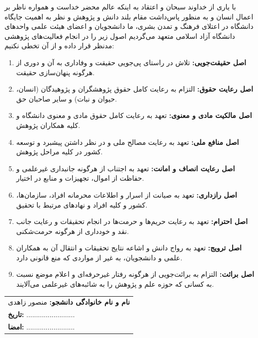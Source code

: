 با یاری از خداوند سبحان و اعتقاد به اینکه عالم محضر خداست و همواره ناظر بر اعمال انسان و به منظور پاس‌داشت مقام بلند دانش و پژوهش و نظر به اهمیت جایگاه دانشگاه در اعتلای فرهنگ و تمدن بشری، ما دانشجویان و اعضای هیئت علمی واحدهای دانشگاه آزاد اسلامی متعهد می‌گردیم اصول زیر را در انجام فعالیت‌های پژوهشی مدنظر قرار داده و از آن تخطی نکنیم:

\begin{enumerate}
    \item \textbf{اصل حقیقت‌جویی:} تلاش در راستای پی‌جویی حقیقت و وفاداری به آن و دوری از هرگونه پنهان‌سازی حقیقت.
    \item \textbf{اصل رعایت حقوق:} التزام به رعایت کامل حقوق پژوهشگران و پژوهیدگان (انسان، حیوان و نبات) و سایر صاحبان حق.
    \item \textbf{اصل مالکیت مادی و معنوی:} تعهد به رعایت کامل حقوق مادی و معنوی دانشگاه و کلیه همکاران پژوهش.
    \item \textbf{اصل منافع ملی:} تعهد به رعایت مصالح ملی و در نظر داشتن پیشبرد و توسعه کشور در کلیه مراحل پژوهش.
    \item \textbf{اصل رعایت انصاف و امانت:} تعهد به اجتناب از هرگونه جانبداری غیرعلمی و حفاظت از اموال، تجهیزات و منابع در اختیار.
    \item \textbf{اصل رازداری:} تعهد به صیانت از اسرار و اطلاعات محرمانه افراد، سازمان‌ها، کشور و کلیه افراد و نهادهای مرتبط با تحقیق.
    \item \textbf{اصل احترام:} تعهد به رعایت حریم‌ها و حرمت‌ها در انجام تحقیقات و رعایت جانب نقد و خودداری از هرگونه حرمت‌شکنی.
    \item \textbf{اصل ترویج:} تعهد به رواج دانش و اشاعه نتایج تحقیقات و انتقال آن به همکاران علمی و دانشجویان، به غیر از مواردی که منع قانونی دارد.
    \item \textbf{اصل برائت:} التزام به برائت‌جویی از هرگونه رفتار غیرحرفه‌ای و اعلام موضع نسبت به کسانی که حوزه علم و پژوهش را به شائبه‌های غیرعلمی می‌آلایند.
\end{enumerate}

\vspace{1cm}

\begin{flushleft}
\begin{tabular}{l}
\textbf{نام و نام خانوادگی دانشجو:} منصور زاهدی \\
\textbf{تاریخ:} ......................... \\
\textbf{امضا:} ......................... \\
\end{tabular}
\end{flushleft}



